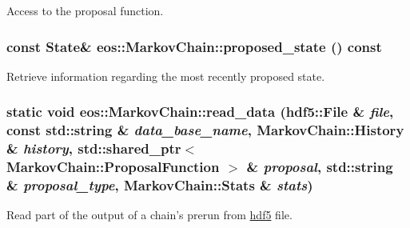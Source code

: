 Access to the proposal function. \hypertarget{classeos_1_1MarkovChain_a094a7852f4983a3c26e6a062b66f2547}{
\subsubsection[{proposed\_\-state}]{\setlength{\rightskip}{0pt plus 5cm}const {\bf State}\& eos::MarkovChain::proposed\_\-state () const}}
\label{classeos_1_1MarkovChain_a094a7852f4983a3c26e6a062b66f2547}


Retrieve information regarding the most recently proposed state. \hypertarget{classeos_1_1MarkovChain_a9d67db1a7839b07dc43a847b6383e619}{
\subsubsection[{read\_\-data}]{\setlength{\rightskip}{0pt plus 5cm}static void eos::MarkovChain::read\_\-data ({\bf hdf5::File} \& {\em file}, \/  const std::string \& {\em data\_\-base\_\-name}, \/  {\bf MarkovChain::History} \& {\em history}, \/  std::shared\_\-ptr$<$ {\bf MarkovChain::ProposalFunction} $>$ \& {\em proposal}, \/  std::string \& {\em proposal\_\-type}, \/  {\bf MarkovChain::Stats} \& {\em stats})}}
\label{classeos_1_1MarkovChain_a9d67db1a7839b07dc43a847b6383e619}
Read part of the output of a chain's prerun from \hyperlink{namespaceeos_1_1hdf5}{hdf5} file.


